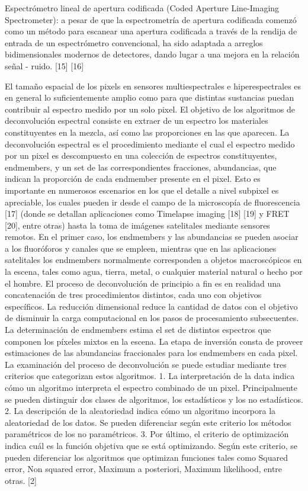 \documentclass{ctuthesis}
\begin{document}
Espectrómetro lineal de apertura codificada (Coded Aperture Line-Imaging Spectrometer): a pesar de que la espectrometría de apertura codificada comenzó como un método para escanear una apertura codificada a través de la rendija de entrada de un espectrómetro convencional, ha sido adaptada a arreglos bidimensionales modernos de detectores, dando lugar a una mejora en la relación señal - ruido. [15] [16]

El tamaño espacial de los pixels en sensores multiespectrales e hiperespectrales es en general lo suficientemente amplio como para que distintas sustancias puedan contribuir al espectro medido por un solo pixel. El objetivo de los algoritmos de deconvolución espectral consiste en extraer de un espectro los materiales constituyentes en la mezcla, así como las proporciones en las que aparecen. 
La deconvolución espectral es el procedimiento mediante el cual el espectro medido por un pixel es descompuesto en una colección de espectros constituyentes, endmembers, y un set de las correspondientes fracciones, abundancias, que indican la proporción de cada endmember presente en el pixel. Esto es importante en numerosos escenarios en los que el detalle a nivel subpixel es apreciable, los cuales pueden ir desde el campo de la microscopía de fluorescencia [17] (donde se detallan aplicaciones como Timelapse imaging [18] [19] y FRET [20], entre otras) hasta la toma de imágenes satelitales mediante sensores remotos. En el primer caso, los endmembers y las abundancias se pueden asociar a los fluoróforos y canales que se empleen, mientras que en las aplicaciones satelitales los endmembers normalmente corresponden a objetos macroscópicos en la escena, tales como agua, tierra, metal, o cualquier material natural o hecho por el hombre.
El proceso de deconvolución de principio a fin es en realidad una concatenación de tres procedimientos distintos, cada uno con objetivos específicos. La reducción dimensional reduce la cantidad de datos con el objetivo de disminuir la carga computacional en los pasos de procesamiento subsecuentes. La determinación de endmembers estima el set de distintos espectros que componen los píxeles mixtos en la escena. La etapa de inversión consta de proveer estimaciones de las abundancias fraccionales para los endmembers en cada pixel. 
La examinación del proceso de deconvolución se puede estudiar mediante tres criterios que categorizan estos algoritmos. 1. La interpretación de la data indica cómo un algoritmo interpreta el espectro combinado de un pixel. Principalmente se pueden distinguir dos clases de algoritmos, los estadísticos y los no estadísticos. 2. La descripción de la aleatoriedad indica cómo un algoritmo incorpora la aleatoriedad de los datos. Se pueden diferenciar según este criterio los métodos paramétricos de los no paramétricos. 3. Por último, el criterio de optimización indica cuál es la función objetiva que se está optimizando. Según este criterio, se pueden diferenciar los algoritmos que optimizan funciones tales como Squared error, Non squared error, Maximum a posteriori, Maximum likelihood, entre otras. [2]
\end{document}

